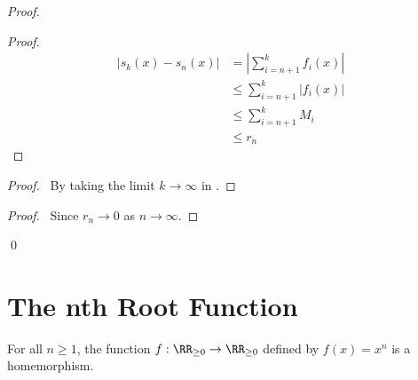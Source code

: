\begin{proof}
    \pf
    \begin{proof}
        \pf
        \begin{align*}
            |s_k(x) - s_n(x)| & = |\sum_{i=n+1}^k f_i(x)| \\
            & \leq \sum_{i=n+1}^k |f_i(x)| \\
            & \leq \sum_{i=n+1}^k M_i \\
            & \leq r_n
        \end{align*}
    \end{proof}
    \begin{proof}
        \pf\ By taking the limit $k \rightarrow \infty$ in .
    \end{proof}
    \qedstep
    \begin{proof}
        \pf\ Since $r_n \rightarrow 0$ as $n \rightarrow \infty$.
    \end{proof}
    \qed
\end{proof}

\section{The nth Root Function}

\begin{proposition}
    For all $n \geq 1$, the function $f : \RR_{\geq 0} \rightarrow \RR_{\geq 0}$ defined by $f(x) = x^n$ is a homemorphism.
\end{proposition}

